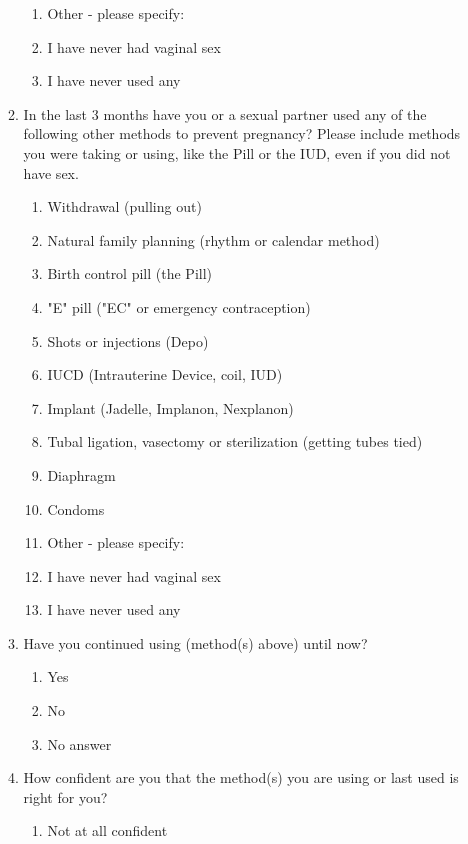 \begin{enumerate}
\begin{enumerate}
\begin{enumerate}
            \item Other - please specify:
            \item I have never had vaginal sex
            \item I have never used any
        \end{enumerate}
        \item In the last 3 months have you or a sexual partner used any of the following other methods to prevent pregnancy? Please include methods you were taking or using, like the Pill or the IUD, even if you did not have sex.
        \begin{enumerate}
            \item Withdrawal (pulling out)
            \item Natural family planning (rhythm or calendar method)
            \item Birth control pill (the Pill)
            \item "E" pill ("EC" or emergency contraception)
            \item Shots or injections (Depo)
            \item IUCD (Intrauterine Device, coil, IUD)
            \item Implant (Jadelle, Implanon, Nexplanon)
            \item Tubal ligation, vasectomy or sterilization (getting tubes tied)
            \item Diaphragm
            \item Condoms
            \item Other - please specify:
            \item I have never had vaginal sex
            \item I have never used any
        \end{enumerate}  
        \item Have you continued using (method(s) above) until now?
            \begin{enumerate}
                \item Yes
                \item No
                \item No answer
            \end{enumerate}  
        \item How confident are you that the method(s) you are using or last used is right for you?
        \begin{enumerate}
            \item Not at all confident

\end{enumerate}
\end{enumerate}
\end{enumerate}

